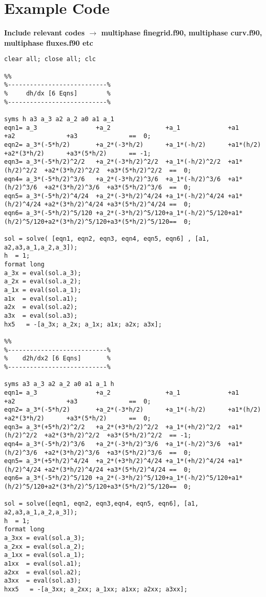 \chapter{Example Code}\label{appendixa}
\textbf{ Include relevant codes $\rightarrow$ multiphase finegrid.f90, multiphase curv.f90, multiphase fluxes.f90 etc }
\begin{verbatim}
clear all; close all; clc

%%
%---------------------------%
%     dh/dx [6 Eqns]        %
%---------------------------%

syms h a3 a_3 a2 a_2 a0 a1 a_1
eqn1= a_3                +a_2               +a_1             +a1            +a2              +a3              ==  0;
eqn2= a_3*(-5*h/2)       +a_2*(-3*h/2)      +a_1*(-h/2)      +a1*(h/2)      +a2*(3*h/2)      +a3*(5*h/2)      == -1;
eqn3= a_3*(-5*h/2)^2/2   +a_2*(-3*h/2)^2/2  +a_1*(-h/2)^2/2  +a1*(h/2)^2/2  +a2*(3*h/2)^2/2  +a3*(5*h/2)^2/2  ==  0;
eqn4= a_3*(-5*h/2)^3/6   +a_2*(-3*h/2)^3/6  +a_1*(-h/2)^3/6  +a1*(h/2)^3/6  +a2*(3*h/2)^3/6  +a3*(5*h/2)^3/6  ==  0;
eqn5= a_3*(-5*h/2)^4/24  +a_2*(-3*h/2)^4/24 +a_1*(-h/2)^4/24 +a1*(h/2)^4/24 +a2*(3*h/2)^4/24 +a3*(5*h/2)^4/24 ==  0;
eqn6= a_3*(-5*h/2)^5/120 +a_2*(-3*h/2)^5/120+a_1*(-h/2)^5/120+a1*(h/2)^5/120+a2*(3*h/2)^5/120+a3*(5*h/2)^5/120==  0;

sol = solve( [eqn1, eqn2, eqn3, eqn4, eqn5, eqn6] , [a1, a2,a3,a_1,a_2,a_3]);
h  = 1;
format long
a_3x = eval(sol.a_3);
a_2x = eval(sol.a_2);
a_1x = eval(sol.a_1);
a1x  = eval(sol.a1);
a2x  = eval(sol.a2);
a3x  = eval(sol.a3);
hx5   = -[a_3x; a_2x; a_1x; a1x; a2x; a3x];

%%
%---------------------------%
%    d2h/dx2 [6 Eqns]       %
%---------------------------%

syms a3 a_3 a2 a_2 a0 a1 a_1 h
eqn1= a_3                +a_2               +a_1             +a1            +a2              +a3              ==  0;
eqn2= a_3*(-5*h/2)       +a_2*(-3*h/2)      +a_1*(-h/2)      +a1*(h/2)      +a2*(3*h/2)      +a3*(5*h/2)      ==  0;
eqn3= a_3*(+5*h/2)^2/2   +a_2*(+3*h/2)^2/2  +a_1*(+h/2)^2/2  +a1*(h/2)^2/2  +a2*(3*h/2)^2/2  +a3*(5*h/2)^2/2  == -1;
eqn4= a_3*(-5*h/2)^3/6   +a_2*(-3*h/2)^3/6  +a_1*(-h/2)^3/6  +a1*(h/2)^3/6  +a2*(3*h/2)^3/6  +a3*(5*h/2)^3/6  ==  0;
eqn5= a_3*(+5*h/2)^4/24  +a_2*(+3*h/2)^4/24 +a_1*(+h/2)^4/24 +a1*(h/2)^4/24 +a2*(3*h/2)^4/24 +a3*(5*h/2)^4/24 ==  0;
eqn6= a_3*(-5*h/2)^5/120 +a_2*(-3*h/2)^5/120+a_1*(-h/2)^5/120+a1*(h/2)^5/120+a2*(3*h/2)^5/120+a3*(5*h/2)^5/120==  0;

sol = solve([eqn1, eqn2, eqn3,eqn4, eqn5, eqn6], [a1, a2,a3,a_1,a_2,a_3]);
h  = 1;
format long
a_3xx = eval(sol.a_3);
a_2xx = eval(sol.a_2);
a_1xx = eval(sol.a_1);
a1xx  = eval(sol.a1);
a2xx  = eval(sol.a2);
a3xx  = eval(sol.a3);
hxx5   = -[a_3xx; a_2xx; a_1xx; a1xx; a2xx; a3xx];



\end{verbatim}
